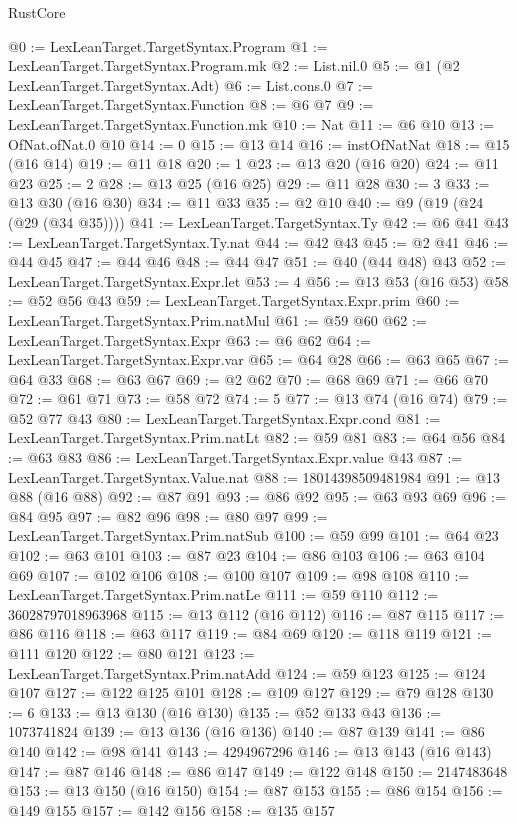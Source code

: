 \begin{lexlean}{RustCore}
\begin{coremodule}
@0 := LexLeanTarget.TargetSyntax.Program
@1 := LexLeanTarget.TargetSyntax.Program.mk
@2 := List.nil.{0}
@5 := @1 (@2 LexLeanTarget.TargetSyntax.Adt)
@6 := List.cons.{0}
@7 := LexLeanTarget.TargetSyntax.Function
@8 := @6 @7
@9 := LexLeanTarget.TargetSyntax.Function.mk
@10 := Nat
@11 := @6 @10
@13 := OfNat.ofNat.{0} @10
@14 := 0
@15 := @13 @14
@16 := instOfNatNat
@18 := @15 (@16 @14)
@19 := @11 @18
@20 := 1
@23 := @13 @20 (@16 @20)
@24 := @11 @23
@25 := 2
@28 := @13 @25 (@16 @25)
@29 := @11 @28
@30 := 3
@33 := @13 @30 (@16 @30)
@34 := @11 @33
@35 := @2 @10
@40 := @9 (@19 (@24 (@29 (@34 @35))))
@41 := LexLeanTarget.TargetSyntax.Ty
@42 := @6 @41
@43 := LexLeanTarget.TargetSyntax.Ty.nat
@44 := @42 @43
@45 := @2 @41
@46 := @44 @45
@47 := @44 @46
@48 := @44 @47
@51 := @40 (@44 @48) @43
@52 := LexLeanTarget.TargetSyntax.Expr.let
@53 := 4
@56 := @13 @53 (@16 @53)
@58 := @52 @56 @43
@59 := LexLeanTarget.TargetSyntax.Expr.prim
@60 := LexLeanTarget.TargetSyntax.Prim.natMul
@61 := @59 @60
@62 := LexLeanTarget.TargetSyntax.Expr
@63 := @6 @62
@64 := LexLeanTarget.TargetSyntax.Expr.var
@65 := @64 @28
@66 := @63 @65
@67 := @64 @33
@68 := @63 @67
@69 := @2 @62
@70 := @68 @69
@71 := @66 @70
@72 := @61 @71
@73 := @58 @72
@74 := 5
@77 := @13 @74 (@16 @74)
@79 := @52 @77 @43
@80 := LexLeanTarget.TargetSyntax.Expr.cond
@81 := LexLeanTarget.TargetSyntax.Prim.natLt
@82 := @59 @81
@83 := @64 @56
@84 := @63 @83
@86 := LexLeanTarget.TargetSyntax.Expr.value @43
@87 := LexLeanTarget.TargetSyntax.Value.nat
@88 := 18014398509481984
@91 := @13 @88 (@16 @88)
@92 := @87 @91
@93 := @86 @92
@95 := @63 @93 @69
@96 := @84 @95
@97 := @82 @96
@98 := @80 @97
@99 := LexLeanTarget.TargetSyntax.Prim.natSub
@100 := @59 @99
@101 := @64 @23
@102 := @63 @101
@103 := @87 @23
@104 := @86 @103
@106 := @63 @104 @69
@107 := @102 @106
@108 := @100 @107
@109 := @98 @108
@110 := LexLeanTarget.TargetSyntax.Prim.natLe
@111 := @59 @110
@112 := 36028797018963968
@115 := @13 @112 (@16 @112)
@116 := @87 @115
@117 := @86 @116
@118 := @63 @117
@119 := @84 @69
@120 := @118 @119
@121 := @111 @120
@122 := @80 @121
@123 := LexLeanTarget.TargetSyntax.Prim.natAdd
@124 := @59 @123
@125 := @124 @107
@127 := @122 @125 @101
@128 := @109 @127
@129 := @79 @128
@130 := 6
@133 := @13 @130 (@16 @130)
@135 := @52 @133 @43
@136 := 1073741824
@139 := @13 @136 (@16 @136)
@140 := @87 @139
@141 := @86 @140
@142 := @98 @141
@143 := 4294967296
@146 := @13 @143 (@16 @143)
@147 := @87 @146
@148 := @86 @147
@149 := @122 @148
@150 := 2147483648
@153 := @13 @150 (@16 @150)
@154 := @87 @153
@155 := @86 @154
@156 := @149 @155
@157 := @142 @156
@158 := @135 @157

\end{coremodule}
\end{lexlean}
